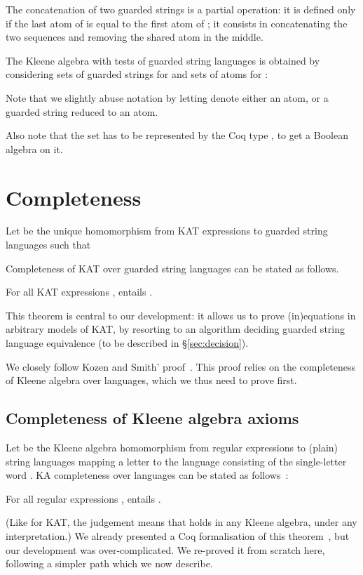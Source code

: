 \documentclass[a4paper]{llncs}
\newif\iflong\longfalse
\begin{document}
The concatenation  of two guarded strings  is a partial
operation: it is defined only if the last atom of  is equal to the
first atom of ; it consists in concatenating the two sequences and
removing the shared atom in the middle.
\iflong
This (partial) operation is easily shown to be associative.
\fi

The Kleene algebra with tests of guarded string languages is obtained
by considering sets of guarded strings for  and sets of atoms for :

Note that we slightly abuse notation by letting  denote
either an atom, or a guarded string reduced to an atom.
\iflong
These sets and operations are shown to form a Kleene algebra with
tests.  
\fi
Also note that the set  has to be represented by the Coq
type , to get a Boolean algebra on it.



\section{Completeness}
\label{sec:completeness}

Let  be the unique homomorphism from KAT expressions to guarded
string languages such that

\iflong
(i.e., a primitive test is mapped to the set of atoms that declare it
to hold, and a letter  is mapped to the set of all guarded string
containing a single letter, ).
\fi
Completeness of KAT over guarded string languages can be stated as
follows.
\begin{theorem}
  \label{thm:kat:compl}
  For all KAT expressions ,  entails .
\end{theorem}
This theorem is central to our development: it allows us to prove
(in)equations in arbitrary models of KAT, by resorting to an algorithm
deciding guarded string language equivalence (to be described in
§\ref{sec:decision}).

We closely follow Kozen and Smith'
proof~\cite{kozens96:kat:completeness:decidability}. This proof relies
on the completeness of Kleene algebra over languages, which we thus
need to prove first.

\subsection{Completeness of Kleene algebra axioms}
\label{ssec:ka:completeness}

Let  be the Kleene algebra homomorphism from regular expressions to
(plain) string languages mapping a letter  to the language
consisting of the single-letter word . KA completeness over
languages can be stated as follows~\cite{kozen94:ka:completeness}:
\begin{theorem}
  \label{thm:ka:compl}
  For all regular expressions ,  entails .
\end{theorem}
(Like for KAT, the judgement  means that  holds in
any Kleene algebra, under any interpretation.) We already presented a
Coq formalisation of this theorem~\cite{bp:itp10:kacoq}, but our
development was over-complicated. We re-proved it from scratch here,
following a simpler path which we now describe.
\end{document}
